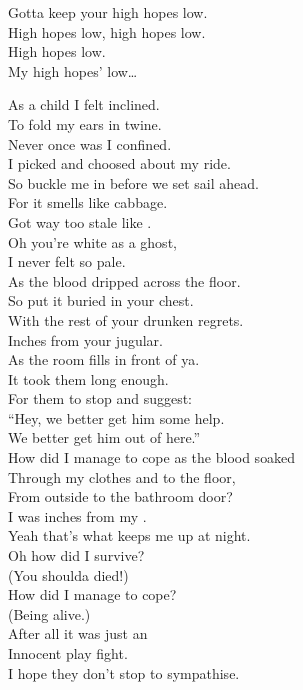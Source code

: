 Gotta keep your high hopes low. \\
High hopes low, high hopes low. \\

High hopes low. \\

My high hopes' low… \\




As a child I felt inclined. \\
To fold my ears in twine. \\
Never once was I confined. \\
I picked and choosed about my ride. \\
So buckle me in before we set sail ahead. \\
For it smells like cabbage. \\
Got way too stale like . \\

Oh you're white as a ghost, \\
I never felt so pale. \\
As the blood dripped across the floor. \\

So put it buried in your chest. \\
With the rest of your drunken regrets. \\
Inches from your jugular. \\
As the room fills in front of ya. \\
It took them long enough. \\
For them to stop and suggest: \\
``Hey, we better get him some help. \\
We better get him out of here.'' \\

How did I manage to cope as the blood soaked \\
Through my clothes and to the floor, \\
From outside to the bathroom door? \\
I was inches from my . \\
Yeah that's what keeps me up at night. \\

Oh how did I survive? \\
(You shoulda died!) \\
How did I manage to cope? \\
(Being alive.) \\
After all it was just an \\
Innocent play fight. \\
I hope they don't stop to sympathise. \\

